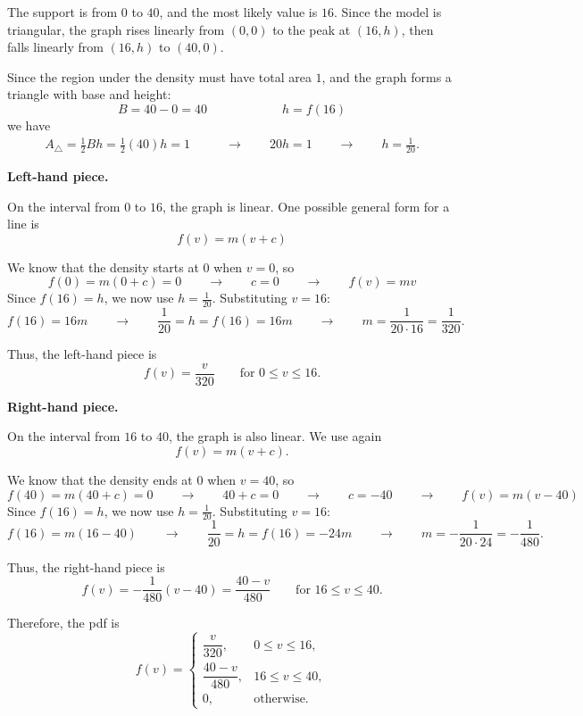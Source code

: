 	The support is from $0$ to $40$, and the most likely value is $16$. Since the model is triangular, the graph rises linearly from $(0,0)$ to the peak at $(16,h)$, then falls linearly from $(16,h)$ to $(40,0)$.
	
	Since the region under the density must have total area \(1\), and the graph forms a triangle with base and height:
	\[
	B=40-0=40
	\qquad \qquad \qquad
	h=f(16)
	\]
	we have
	\[
	\begin{aligned}
		A_{\triangle}=\frac{1}{2}Bh
		=\frac{1}{2}(40)h
		=1
		&\qquad \longrightarrow \qquad
		20h=1
		\qquad \longrightarrow \qquad
		h=\frac{1}{20}.
	\end{aligned}
	\]
	
	\textbf{Left-hand piece.}
	
	On the interval from $0$ to $16$, the graph is linear. One possible general form for a line is
	\[
	f(v)=m(v+c)
	\]
	
	We know that the density starts at $0$ when $v=0$, so
	\[
	f(0)=m(0+c)=0
	\qquad \longrightarrow \qquad
	c=0
	\qquad \longrightarrow \qquad
	f(v)=mv
	\]
	Since \(f(16)=h\), we now use \(h=\frac{1}{20}\). Substituting \(v=16\):
	\[
	f(16)=16m
	\qquad \longrightarrow \qquad
	\frac{1}{20}=h=f(16)=16m
	\qquad \longrightarrow \qquad
	m=\frac{1}{20\cdot 16}=\frac{1}{320}.
	\]
	
	Thus, the left-hand piece is
	\[
	f(v)=\frac{v}{320}
	\qquad \text{for }0\le v\le 16.
	\]
	
	\textbf{Right-hand piece.}
	
	On the interval from $16$ to $40$, the graph is also linear. We use again
	\[
	f(v)=m(v+c).
	\]
	
	We know that the density ends at $0$ when \(v=40\), so
	\[
	f(40)=m(40+c)=0
	\qquad \longrightarrow \qquad
	40+c=0
	\qquad \longrightarrow \qquad
	c=-40
	\qquad \longrightarrow \qquad
	f(v)=m(v-40)
	\]
	Since \(f(16)=h\), we now use \(h=\frac{1}{20}\). Substituting \(v=16\):
	\[
	f(16)=m(16-40)
	\qquad \longrightarrow \qquad
	\frac{1}{20}=h=f(16)=-24m
	\qquad \longrightarrow \qquad
	m=-\frac{1}{20\cdot 24}=-\frac{1}{480}.
	\]
	
	Thus, the right-hand piece is
	\[
	f(v)=-\frac{1}{480}(v-40)=\frac{40-v}{480}
	\qquad \text{for }16\le v\le 40.
	\]
	
	Therefore, the pdf is
	\[
	f(v)=
	\begin{cases}
		\dfrac{v}{320}, & 0\le v\le 16,\\[6pt]
		\dfrac{40-v}{480}, & 16\le v\le 40,\\[6pt]
		0, & \text{otherwise.}
	\end{cases}
	\]
	

